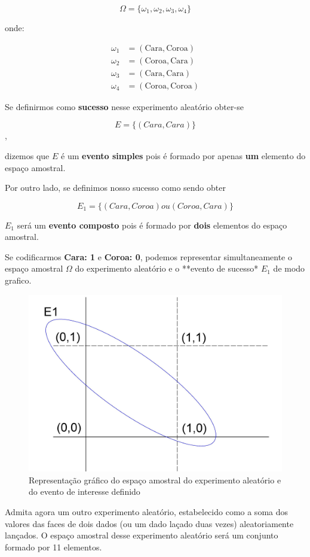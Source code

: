 \documentclass[
]{book}
\begin{document}
\[
\Omega = \{\omega_{1}, \omega_{2}, \omega_{3}, \omega_{4}\}
\]

onde:

\begin{align*}
\omega_{1} & = (\text{Cara}, \text{Coroa})\\
\omega_{2} & = (\text{Coroa}, \text{Cara})\\
\omega_{3} & = (\text{Cara}, \text{Cara}) \\
\omega_{4} & = (\text{Coroa}, \text{Coroa})
\end{align*}

Se definirmos como \textbf{sucesso} nesse experimento aleatório obter-se

\[
E=\{(Cara, Cara)\}
\],

dizemos que \(E\) é um \textbf{evento simples} pois é formado por apenas \textbf{um} elemento do espaço amostral.

Por outro lado, se definimos nosso sucesso como sendo obter

\[
E_{1}=\{(Cara, Coroa) ou (Coroa, Cara)\}
\]

\(E_{1}\) será um \textbf{evento composto} pois é formado por \textbf{dois} elementos do espaço amostral.

Se codificarmos \textbf{Cara: 1} e \textbf{Coroa: 0}, podemos representar simultaneamente o espaço amostral \(\Omega\) do experimento aleatório e o **evento de sucesso* \(E_{1}\) de modo grafico.

\hfill\break

\begin{figure}

{\centering \includegraphics[width=0.5\linewidth]{images4/evento_grafico} 

}

\caption{Representação gráfico do espaço amostral do experimento aleatório e do evento de interesse definido}\label{fig:unnamed-chunk-61}
\end{figure}

Admita agora um outro experimento aleatório, estabelecido como a soma dos valores das faces de dois dados (ou um dado laçado duas vezes) aleatoriamente lançados. O espaço amostral desse experimento aleatório será um conjunto formado por 11 elementos.
\end{document}
